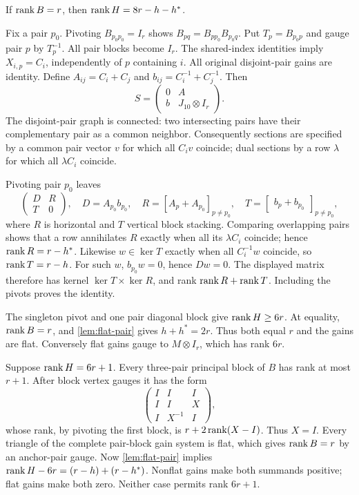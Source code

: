 \begin{lemma}\label{lem:flat-pair}
\notformalized
If $\operatorname{rank} B=r$, then $\operatorname{rank} H=8r-h-h^*$.
\end{lemma}
\begin{informalproof}
Fix a pair $p_0$. Pivoting $B_{p_0p_0}=I_r$ shows
$B_{pq}=B_{pp_0}B_{p_0q}$. Put $T_p=B_{p_0p}$ and gauge pair $p$
by $T_p^{-1}$. All pair blocks become $I_r$. The shared-index
identities imply $X_{i,p}=C_i$, independently of $p$ containing $i$.
All original disjoint-pair gains are identity. Define
$A_{ij}=C_i+C_j$ and $b_{ij}=C_i^{-1}+C_j^{-1}$. Then
\[
 S=\begin{pmatrix}0&A\\b&J_{10}\otimes I_r\end{pmatrix}.
\]
The disjoint-pair graph is connected: two intersecting pairs have
their complementary pair as a common neighbor. Consequently sections
are specified by a common pair vector $v$ for which all $C_iv$ coincide;
dual sections by a row $\lambda$ for which all $\lambda C_i$ coincide.

Pivoting pair $p_0$ leaves
\[
 \begin{pmatrix}D&R\\T&0\end{pmatrix},\quad
 D=A_{p_0}b_{p_0},\quad
 R=[A_p+A_{p_0}]_{p\ne p_0},\quad
 T=\begin{bmatrix}b_p+b_{p_0}\end{bmatrix}_{p\ne p_0},
\]
where $R$ is horizontal and $T$ vertical block stacking.
Comparing overlapping pairs shows that a row annihilates $R$ exactly
when all its $\lambda C_i$ coincide; hence $\operatorname{rank} R=r-h^*$.
Likewise $w\in\ker T$ exactly when all $C_i^{-1}w$ coincide, so
$\operatorname{rank} T=r-h$. For such $w$, $b_{p_0}w=0$, hence $Dw=0$.
The displayed matrix therefore has kernel $\ker T\times\ker R$,
and rank $\operatorname{rank} R+\operatorname{rank} T$. Including the pivots proves the identity.
\end{informalproof}

\begin{informalproof}
The singleton pivot and one pair diagonal block give $\operatorname{rank} H\ge6r$.
At equality, $\operatorname{rank} B=r$, and \cref{lem:flat-pair} gives
$h+h^*=2r$. Thus both equal $r$ and the gains are flat. Conversely
flat gains gauge to $M\otimes I_r$, which has rank $6r$.

Suppose $\operatorname{rank} H=6r+1$. Every three-pair principal block of $B$ has
rank at most $r+1$. After block vertex gauges it has the form
\[
 \begin{pmatrix}I&I&I\\I&I&X\\I&X^{-1}&I\end{pmatrix},
\]
whose rank, by pivoting the first block, is $r+2\operatorname{rank}(X-I)$.
Thus $X=I$. Every triangle of the complete pair-block gain system
is flat, which gives $\operatorname{rank} B=r$ by an anchor-pair gauge.
Now \cref{lem:flat-pair} implies
$\operatorname{rank} H-6r=(r-h)+(r-h^*)$. Nonflat gains make both summands positive;
flat gains make both zero. Neither case permits rank $6r+1$.
\end{informalproof}

